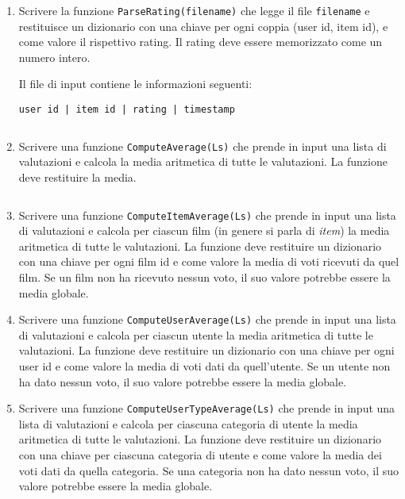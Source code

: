 \documentclass[11pt,a4]{article}
\newcommand{\mybox}[2]{$\quad$\fbox{
\begin{minipage}{#1cm}
\hfill\vspace{#2cm}
\end{minipage}
}}
\begin{document}
\begin{enumerate}
\item Scrivere la funzione {\tt ParseRating(filename)} che legge il file {\tt filename}
e restituisce un dizionario con una chiave per ogni coppia (user id, item id), e come valore il rispettivo rating. 
Il rating deve essere memorizzato come un numero intero.

Il file di input contiene le informazioni seguenti:
\begin{center}
{\tt user id | item id | rating | timestamp}
\end{center}

\mybox{15}{2}

\item Scrivere una funzione {\tt ComputeAverage(Ls)} che prende in input una lista di valutazioni e calcola
la media aritmetica di tutte le valutazioni. La funzione deve restituire la media.

\mybox{15}{2}


\item Scrivere una funzione {\tt ComputeItemAverage(Ls)} che prende in input una lista di valutazioni e calcola
per ciascun film (in genere si parla di {\it item}) la media aritmetica di tutte le valutazioni. La funzione deve restituire un dizionario con una chiave
per ogni film id e come valore la media di voti ricevuti da quel film. Se un film non ha ricevuto nessun voto,
il suo valore potrebbe essere la media globale.


\item Scrivere una funzione {\tt ComputeUserAverage(Ls)} che prende in input una lista di valutazioni e calcola
per ciascun utente la media aritmetica di tutte le valutazioni. La funzione deve restituire un dizionario con una chiave
per ogni user id e come valore la media di voti dati da quell'utente. Se un utente non ha dato nessun voto,
il suo valore potrebbe essere la media globale.


\item Scrivere una funzione {\tt ComputeUserTypeAverage(Ls)} che prende in input una lista di valutazioni e calcola
per ciascuna categoria di utente la media aritmetica di tutte le valutazioni. La funzione deve restituire un dizionario con una chiave
per ciascuna categoria di utente e come valore la media dei voti dati da quella categoria. Se una categoria non ha dato nessun voto,
il suo valore potrebbe essere la media globale.



\end{enumerate}
\end{document}
